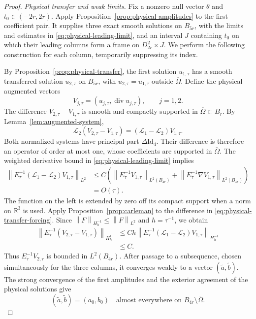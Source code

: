 \documentclass[11pt]{article}
\newcommand{\R}{\mathbb R}
\newcommand{\Id}{\mathrm{Id}}
\DeclareMathOperator{\diverg}{div}
\newcommand{\norm}[1]{\left\lVert #1\right\rVert}
\newcommand{\Lcal}{\mathcal L}
\theoremstyle{remark}
\numberwithin{equation}{section}
\begin{document}
\begin{proof}
\emph{Physical transfer and weak limits.}
Fix a nonzero null vector $\theta$ and $t_0\in(-2r,2r)$. Apply
Proposition~\ref{prop:physical-amplitudes} to the first coefficient
pair. It supplies three exact smooth solutions on $B_{5r}$, with the
limits and estimates in \eqref{eq:physical-leading-limit}, and an
interval $J$ containing $t_0$ on which their leading columns form a
frame on $D_{2r}^2\times J$. We perform the following construction
for each column, temporarily suppressing its index.

By Proposition~\ref{prop:physical-transfer}, the first solution
$u_{1,\tau}$ has a smooth transferred solution $u_{2,\tau}$ on
$B_{5r}$, with
$u_{2,\tau}=u_{1,\tau}$ outside $\overline\Omega$. Define the
physical augmented vectors
\[
 V_{j,\tau}=(u_{j,\tau},\diverg u_{j,\tau}),\qquad j=1,2.
\]
The difference $V_{2,\tau}-V_{1,\tau}$ is smooth and compactly
supported in $\overline\Omega\subset B_r$. By
Lemma~\ref{lem:augmented-system},
\begin{equation}\label{eq:physical-transfer-forcing}
 \Lcal_2(V_{2,\tau}-V_{1,\tau})
       =(\Lcal_1-\Lcal_2)V_{1,\tau}.
\end{equation}
Both normalized systems have principal part $\Delta\Id_4$.
Their difference is therefore an operator of order at most one,
whose coefficients are supported in $\overline\Omega$.
The weighted derivative bound in
\eqref{eq:physical-leading-limit} implies
\[
 \begin{aligned}
 \norm{E_\tau^{-1}(\Lcal_1-\Lcal_2)V_{1,\tau}}_{L^2}
 &\leq C\left(
     \norm{E_\tau^{-1}V_{1,\tau}}_{L^2(B_{4r})}
    +\norm{E_\tau^{-1}\nabla V_{1,\tau}}_{L^2(B_{4r})}
          \right)\\
 &=O(\tau).
 \end{aligned}
\]
The function on the left is extended by zero off its compact support
when a norm on $\R^3$ is used. Apply
Proposition~\ref{prop:carleman} to the difference in
\eqref{eq:physical-transfer-forcing}. Since
$\norm{F}_{H_h^{-1}}\leq\norm{F}_{L^2}$ and $h=\tau^{-1}$, we obtain
\begin{equation}\label{eq:bounded-transferred-amplitudes}
 \begin{aligned}
 \norm{E_\tau^{-1}(V_{2,\tau}-V_{1,\tau})}_{H_h^1}
 &\leq Ch\norm{E_\tau^{-1}(\Lcal_1-\Lcal_2)V_{1,\tau}}_{H_h^{-1}}\\
 &\leq C.
 \end{aligned}
\end{equation}
Thus $E_\tau^{-1}V_{2,\tau}$ is bounded in $L^2(B_{4r})$.
After passage to a subsequence, chosen simultaneously for the three
columns, it converges weakly to a vector $(\widetilde a,\widetilde b)$.
The strong convergence of the first amplitudes and the exterior
agreement of the physical solutions give
\begin{equation}\label{eq:exterior-leading-agreement}
 (\widetilde a,\widetilde b)=(a_0,b_0)
 \quad\text{almost everywhere on }
 B_{4r}\setminus\overline\Omega.
\end{equation}


\end{proof}
\end{document}
